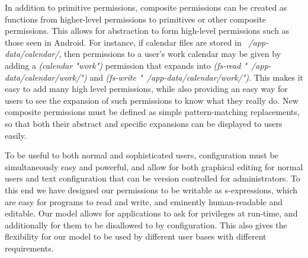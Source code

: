 In addition to primitive permissions, composite permissions can be created as functions from higher-level permissions to primitives or other composite permissions.  This allows for abstraction to form high-level permissions such as those seen in Android.  For instance, if calendar files are stored in \textit{~/app-data/calendar/}, then permissions to a user's work calendar may be given by adding a \textit{(calendar "work")} permission that expands into \textit{(fs-read "~/app-data/calendar/work/")} and \textit{(fs-write "~/app-data/calendar/work/")}.  This makes it easy to add many high level permissions, while also providing an easy way for users to see the expansion of such permissions to know what they really do.  New composite permissions must be defined as simple pattern-matching replacements, so that both their abstract and specific expansions can be displayed to users easily.

To be useful to both normal and sophisticated users, configuration must be simultaneously easy and powerful, and allow for both graphical editing for normal users and text configuration that can be version controlled for administrators.
To this end we have designed our permissions to be writable as s-expressions, which are easy for programs to read and write, and eminently human-readable and editable.
Our model allows for applications to ask for privileges at run-time, and additionally for them to be disallowed to by configuration.  This also gives the flexibility for our model to be used by different user bases with different requirements.

